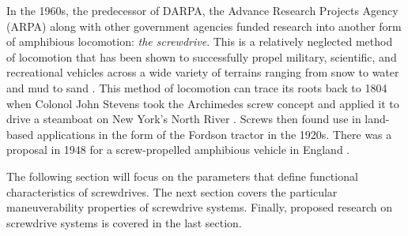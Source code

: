 In the 1960s, the predecessor of DARPA, the Advance Research Projects Agency (ARPA) along with other government agencies funded research into another form of amphibious locomotion: \emph{the screwdrive}. This is a relatively neglected method of locomotion that has been shown to successfully propel military, scientific, and recreational vehicles across a wide variety of terrains ranging from snow to water and mud to sand \cite{Fales1972, Cole1961, Dugoff1967}. This method of locomotion can trace its roots back to 1804 when Colonol John Stevens took the Archimedes screw concept and applied it to drive a steamboat on New York's North River \cite{Dugoff1967}. Screws then found use in land-based applications in the form of the Fordson tractor \cite{Freeberg2010} in the 1920s. There was a proposal in 1948 for a screw-propelled amphibious vehicle in England \cite{Cole1961}. %


The following section will focus on the parameters that define functional characteristics of screwdrives. The next section covers the particular maneuverability properties of screwdrive systems. Finally, proposed research on screwdrive systems is covered in the last section. 


